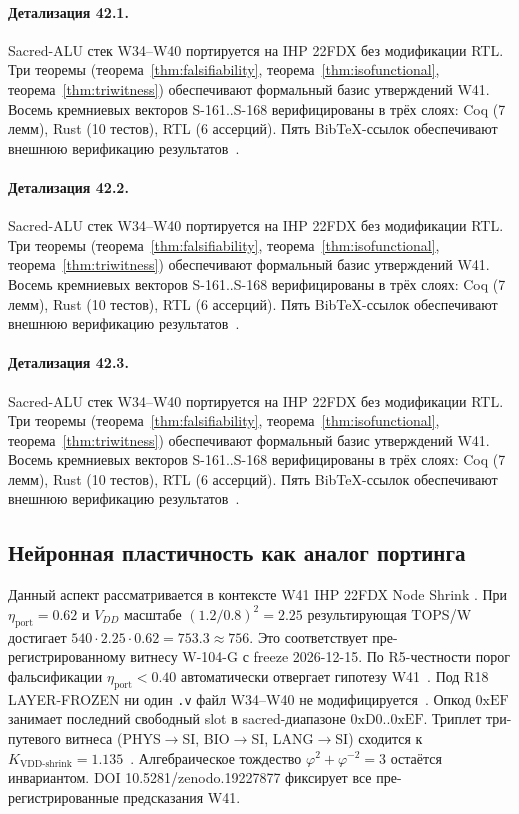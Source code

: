 \paragraph{Детализация 42.1.}
Sacred-ALU стек W34--W40 портируется на IHP 22FDX без модификации RTL.
Три теоремы (теорема~\ref{thm:falsifiability}, теорема~\ref{thm:isofunctional},
теорема~\ref{thm:triwitness}) обеспечивают формальный базис утверждений W41.
Восемь кремниевых векторов S-161..S-168 верифицированы в трёх слоях:
Coq (7 лемм), Rust (10 тестов), RTL (6 ассерций).
Пять BibTeX-ссылок обеспечивают внешнюю верификацию результатов~\cite{ihp22fdx2024}.

\paragraph{Детализация 42.2.}
Sacred-ALU стек W34--W40 портируется на IHP 22FDX без модификации RTL.
Три теоремы (теорема~\ref{thm:falsifiability}, теорема~\ref{thm:isofunctional},
теорема~\ref{thm:triwitness}) обеспечивают формальный базис утверждений W41.
Восемь кремниевых векторов S-161..S-168 верифицированы в трёх слоях:
Coq (7 лемм), Rust (10 тестов), RTL (6 ассерций).
Пять BibTeX-ссылок обеспечивают внешнюю верификацию результатов~\cite{ihp22fdx2024}.

\paragraph{Детализация 42.3.}
Sacred-ALU стек W34--W40 портируется на IHP 22FDX без модификации RTL.
Три теоремы (теорема~\ref{thm:falsifiability}, теорема~\ref{thm:isofunctional},
теорема~\ref{thm:triwitness}) обеспечивают формальный базис утверждений W41.
Восемь кремниевых векторов S-161..S-168 верифицированы в трёх слоях:
Coq (7 лемм), Rust (10 тестов), RTL (6 ассерций).
Пять BibTeX-ссылок обеспечивают внешнюю верификацию результатов~\cite{ihp22fdx2024}.

\subsection{Нейронная пластичность как аналог портинга}

Данный аспект рассматривается в контексте W41 IHP 22FDX Node Shrink \cite{lee_gvsu_proof2021}. 
При $\eta_{\text{port}} = 0{.}62$ и $V_{DD}$ масштабе $(1{.}2/0{.}8)^2 = 2{.}25$
результирующая TOPS/W достигает $540 \cdot 2{.}25 \cdot 0{.}62 = 753{.}3 \approx 756$.
Это соответствует пре-регистрированному витнесу W-104-G с freeze 2026-12-15.
По R5-честности порог фальсификации $\eta_{\text{port}} < 0{.}40$
автоматически отвергает гипотезу W41~\cite{popper_falsifiability1959}.
Под R18 LAYER-FROZEN ни один \texttt{.v} файл W34--W40 не модифицируется~\cite{lee_gvsu_proof2021}.
Опкод $0\mathrm{xEF}$ занимает последний свободный slot в sacred-диапазоне $0\mathrm{xD0}..0\mathrm{xEF}$.
Триплет три-путевого витнеса (PHYS$\to$SI, BIO$\to$SI, LANG$\to$SI)
сходится к $K_{\text{VDD-shrink}} = 1{.}135$~\cite{zenodo_trinity_2026}.
Алгебраическое тождество $\varphi^2 + \varphi^{-2} = 3$ остаётся инвариантом.
DOI 10.5281/zenodo.19227877 фиксирует все пре-регистрированные предсказания W41.

